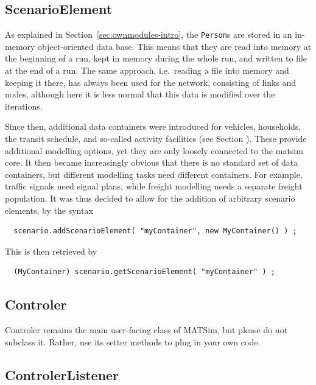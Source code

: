 \subsection{ScenarioElement}

As explained in Section~\ref{sec:ownmodules-intro}, the \verb$Person$s are stored in an in-memory object-oriented data base.  This means that they are read into memory at the beginning of a run, kept in memory during the whole run, and written to file at the end of a run.
%
The same approach, i.e.\ reading a file into memory and keeping it there, has always been used for the network, consisting of links and nodes, although here it is less normal that this data is modified over the iterations.

Since then, additional data containers were introduced for vehicles, households, the transit schedule, and so-called activity facilities (see Section ).  These provide additional modelling options, yet they are only loosely connected to the \acrshort{matsim} core.  It then became increasingly obvious that there is no standard set of data containers, but different modelling tasks need different containers.  For example, traffic signals need signal plans, while freight modelling needs a separate freight population.  It was thus decided to allow for the addition of arbitrary scenario elements, by the syntax
\begin{lstlisting}
  scenario.addScenarioElement( "myContainer", new MyContainer() ) ;
\end{lstlisting}
This is then retrieved by
\begin{lstlisting}
  (MyContainer) scenario.getScenarioElement( "myContainer" ) ;
\end{lstlisting}

\subsection{Controler}
\label{sec:controlerextension}
Controler remains the main user-facing class of MATSim, but please do not subclass it. Rather,
use its setter methods to plug in your own code.

\subsection{ControlerListener}

